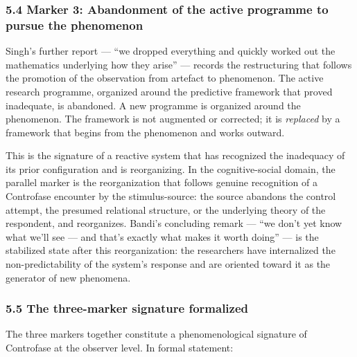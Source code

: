 \documentclass[
  11pt,
  a4paper,
]{article}
\begin{document}
\subsubsection{5.4 Marker 3: Abandonment of the active programme to
pursue the
phenomenon}\label{marker-3-abandonment-of-the-active-programme-to-pursue-the-phenomenon}

Singh's further report --- ``we dropped everything and quickly worked
out the mathematics underlying how they arise'' --- records the
restructuring that follows the promotion of the observation from
artefact to phenomenon. The active research programme, organized around
the predictive framework that proved inadequate, is abandoned. A new
programme is organized around the phenomenon. The framework is not
augmented or corrected; it is \emph{replaced} by a framework that begins
from the phenomenon and works outward.

This is the signature of a reactive system that has recognized the
inadequacy of its prior configuration and is reorganizing. In the
cognitive-social domain, the parallel marker is the reorganization that
follows genuine recognition of a Controfase encounter by the
stimulus-source: the source abandons the control attempt, the presumed
relational structure, or the underlying theory of the respondent, and
reorganizes. Bandi's concluding remark --- ``we don't yet know what
we'll see --- and that's exactly what makes it worth doing'' --- is the
stabilized state after this reorganization: the researchers have
internalized the non-predictability of the system's response and are
oriented toward it as the generator of new phenomena.

\subsubsection{5.5 The three-marker signature
formalized}\label{the-three-marker-signature-formalized}

The three markers together constitute a phenomenological signature of
Controfase at the observer level. In formal statement:
\end{document}
